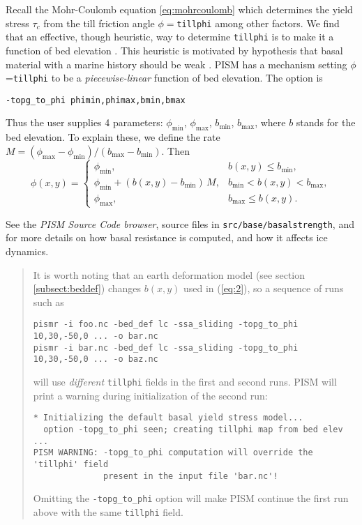 Recall the Mohr-Coulomb equation \eqref{eq:mohrcoulomb} which determines the yield stress $\tau_c$ from the till friction angle $\phi=$\texttt{tillphi} among other factors.  We find that an effective, though heuristic, way to determine \texttt{tillphi} is to make it a function of bed elevation \cite{Winkelmannetal2011}.  This heuristic is motivated by hypothesis that basal material with a marine history should be weak \cite{HuybrechtsdeWolde}.  PISM has a mechanism setting $\phi$=\texttt{tillphi} to be a \emph{piecewise-linear} function of bed elevation.  The option is
\begin{verbatim}
-topg_to_phi phimin,phimax,bmin,bmax
\end{verbatim}
Thus the user supplies 4 parameters: $\phi_{\mathrm{min}}$, $\phi_{\mathrm{max}}$, $b_{\mathrm{min}}$, $b_{\mathrm{max}}$, where $b$ stands for the bed elevation.  To explain these, we define the rate $M = (\phi_{\text{max}} - \phi_{\text{min}}) / (b_{\text{max}} - b_{\text{min}})$.  Then
\begin{equation}
  \phi(x,y) = \begin{cases}
    \phi_{\text{min}}, & b(x,y) \le b_{\text{min}}, \\
    \phi_{\text{min}} + (b(x,y) - b_{\text{min}}) \,M,
    &  b_{\text{min}} < b(x,y) < b_{\text{max}}, \\
    \phi_{\text{max}}, & b_{\text{max}} \le b(x,y). \end{cases}\label{eq:2}
\end{equation}

See the \emph{PISM Source Code browser}, source files in \texttt{src/base/basalstrength}, and \cite{BBssasliding,BKAJS,Martinetal2011,Winkelmannetal2011} for more details on how basal resistance is computed, and how it affects ice dynamics.

\begin{quote}
  It is worth noting that an earth deformation model (see section
  \ref{subsect:beddef}) changes $b(x,y)$ used in (\ref{eq:2}), so a sequence of
  runs such as
\begin{verbatim}
pismr -i foo.nc -bed_def lc -ssa_sliding -topg_to_phi 10,30,-50,0 ... -o bar.nc
pismr -i bar.nc -bed_def lc -ssa_sliding -topg_to_phi 10,30,-50,0 ... -o baz.nc
\end{verbatim}
  will use \emph{different} \texttt{tillphi} fields in the first and second
  runs. PISM will print a warning during initialization of the second run:
\begin{verbatim}
* Initializing the default basal yield stress model...
  option -topg_to_phi seen; creating tillphi map from bed elev ...
PISM WARNING: -topg_to_phi computation will override the 'tillphi' field
              present in the input file 'bar.nc'!
\end{verbatim}
  Omitting the \texttt{-topg_to_phi} option will make PISM continue the first
  run above with the same \texttt{tillphi} field.
\end{quote}

